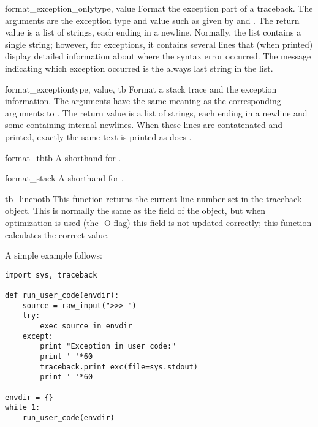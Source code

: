 \begin{funcdesc}{format_exception_only}{type, value}
Format the exception part of a traceback.  The arguments are the
exception type and value such as given by  and
.  The return value is a list of strings, each
ending in a newline.  Normally, the list contains a single string;
however, for  exceptions, it contains several lines
that (when printed) display detailed information about where the
syntax error occurred.  The message indicating which exception
occurred is the always last string in the list.
\end{funcdesc}

\begin{funcdesc}{format_exception}{type, value, tb}
Format a stack trace and the exception information.  The arguments 
have the same meaning as the corresponding arguments to
.  The return value is a list of strings,
each ending in a newline and some containing internal newlines.  When
these lines are contatenated and printed, exactly the same text is
printed as does .
\end{funcdesc}

\begin{funcdesc}{format_tb}{tb}
A shorthand for .
\end{funcdesc}

\begin{funcdesc}{format_stack}{}
A shorthand for .
\end{funcdesc}

\begin{funcdesc}{tb_lineno}{tb}
This function returns the current line number set in the traceback
object.  This is normally the same as the 
field of the object, but when optimization is used (the -O flag) this
field is not updated correctly; this function calculates the correct
value.
\end{funcdesc}

A simple example follows:

\begin{verbatim}
import sys, traceback

def run_user_code(envdir):
    source = raw_input(">>> ")
    try:
        exec source in envdir
    except:
        print "Exception in user code:"
        print '-'*60
        traceback.print_exc(file=sys.stdout)
        print '-'*60

envdir = {}
while 1:
    run_user_code(envdir)
\end{verbatim}
